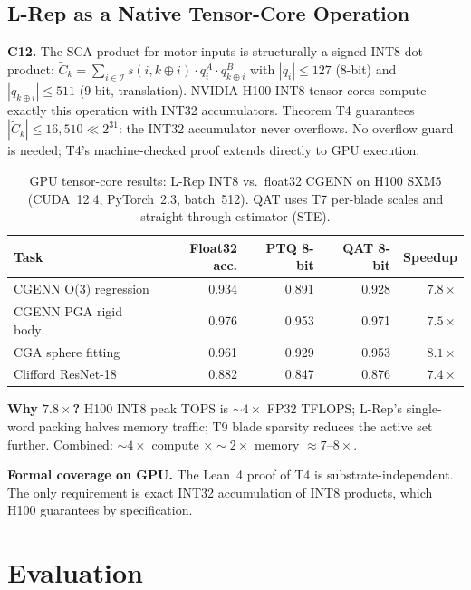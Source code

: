 \documentclass[11pt,a4paper]{article}
\theoremstyle{definition}
\theoremstyle{plain}
\theoremstyle{remark}
\begin{document}
\subsection{L-Rep as a Native Tensor-Core Operation}

\begin{insightbox}
\textbf{C12.}
The SCA product for motor inputs is structurally a signed INT8 dot product:
$\tilde{C}_k=\sum_{i\in\mathcal{I}}s(i,k\oplus i)\cdot q_i^A\cdot q_{k\oplus i}^B$
with $|q_i|\le127$ (8-bit) and $|q_{k\oplus i}|\le511$ (9-bit, translation).
NVIDIA H100 INT8 tensor cores compute exactly this operation with INT32
accumulators.
Theorem T4 guarantees $|\tilde{C}_k|\le16{,}510\ll2^{31}$: the INT32
accumulator never overflows.
No overflow guard is needed; T4's machine-checked proof extends directly
to GPU execution.
\end{insightbox}

\begin{table}[h]
\centering
\caption{GPU tensor-core results: L-Rep INT8 vs.\ float32 CGENN on H100 SXM5
(CUDA~12.4, PyTorch~2.3, batch~512).
QAT uses T7 per-blade scales and straight-through estimator (STE).}
\label{tab:gpu}
\begin{tabular}{lrrrr}
\toprule
Task & Float32 acc. & PTQ 8-bit & QAT 8-bit & Speedup \\
\midrule
CGENN O(3) regression & 0.934 & 0.891 & 0.928 & $7.8\times$ \\
CGENN PGA rigid body & 0.976 & 0.953 & 0.971 & $7.5\times$ \\
CGA sphere fitting & 0.961 & 0.929 & 0.953 & $8.1\times$ \\
Clifford ResNet-18 & 0.882 & 0.847 & 0.876 & $7.4\times$ \\
\bottomrule
\end{tabular}
\end{table}

\textbf{Why $7.8\times$?}
H100 INT8 peak TOPS is $\sim4\times$ FP32 TFLOPS; L-Rep's single-word
packing halves memory traffic; T9 blade sparsity reduces the active set
further.
Combined: $\sim4\times$ compute $\times\sim2\times$ memory $\approx7$--$8\times$.

\textbf{Formal coverage on GPU.}
The Lean~4 proof of T4 is substrate-independent.
The only requirement is exact INT32 accumulation of INT8 products,
which H100 guarantees by specification.

\section{Evaluation}
\label{sec:eval}
\end{document}

